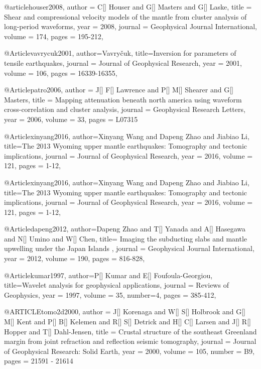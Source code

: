 @article{houser2008,
author = {C[] Houser and G[] Masters and G[] Laske},
title = {Shear and compressional velocity models of the mantle from cluster analysis of long-period waveforms},
year = {2008},
journal = {Geophysical Journal International},
volume = {174},
pages = {195-212},
}


@Article{vavrycuk2001,
  author={Vavry\v{c}uk},
  title={Inversion for parameters of tensile earthquakes},
  journal = 	 {Journal of Geophysical Research},
  year = 	 2001,
  volume =	 106,
  pages =	 {16339-16355},
}

@Article{patro2006,
  author = 	 {J[] F[] Lawrence and P[] M[] Shearer and G[] Masters},
  title = 	 {Mapping attenuation beneath north america using waveform cross-correlation and cluster analysis},
  journal = 	 {Geophysical Research Letters},
  year = 	 2006,
  volume = 33,
  pages =	 {L07315}
}

@Article{xinyang2016,
  author={Xinyang Wang and Dapeng Zhao and Jiabiao Li},
  title={The 2013 Wyoming upper mantle earthquakes: Tomography and tectonic implications},
  journal = 	 {Journal of Geophysical Research},
  year = 	 2016,
  volume =	 121,
  pages =	 {1-12},
}


@Article{xinyang2016,
  author={Xinyang Wang and Dapeng Zhao and Jiabiao Li},
  title={The 2013 Wyoming upper mantle earthquakes: Tomography and tectonic implications},
  journal = 	 {Journal of Geophysical Research},
  year = 	 2016,
  volume =	 121,
  pages =	 {1-12},
}

@Article{dapeng2012,
  author={Dapeng Zhao and T[] Yanada and A[] Hasegawa and N[] Umino and W[] Chen},
  title={ Imaging the subducting slabs and mantle upwelling under the Japan Islands },
  journal = 	 {Geophysical Journal International},
  year = 	 2012,
  volume =	 190,
  pages =	 {816-828},
}


@Article{kumar1997,
  author={P[] Kumar and E[] Foufoula-Georgiou},
  title={Wavelet analysis for geophysical applications},
  journal = 	 {Reviews of Geophysics},
  year = 	 1997,
  volume =	 35,
  number=4,
  pages =	 {385-412},
}

@ARTICLE{tomo2d2000,
  author = {J[] Korenaga and W[] S[] Holbrook and G[] M[] Kent and P[] B[] Kelemen and R[] S[] Detrick and H[] C[] Larsen and J[] R[] Hopper and T[] Dahl-Jensen},
  title = {Crustal structure of the southeast Greenland margin from joint refraction and reflection seismic tomography},
  journal = {Journal of Geophysical Research: Solid Earth},
  year = {2000},
  volume = {105},
  number = B9,
  pages = {21591 - 21614}
}

